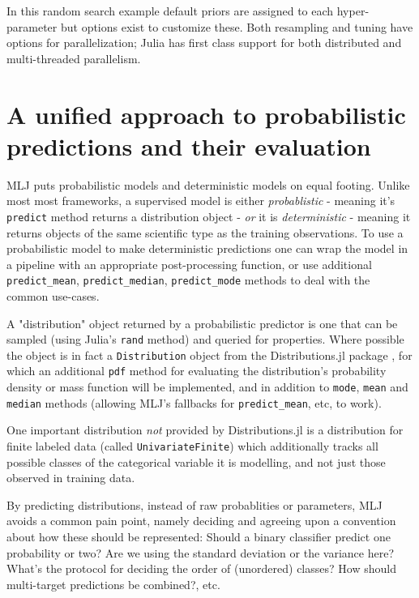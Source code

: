 \documentclass{article}
\begin{document}
In this random search example default priors are assigned to each hyper-parameter but options exist to customize these. Both resampling and tuning have options for parallelization; Julia has first class support for both distributed and multi-threaded parallelism.

\section{A unified approach to probabilistic predictions and their evaluation}

MLJ puts probabilistic models and deterministic models on equal footing. Unlike most most frameworks, a supervised model is either \textit{probablistic} - meaning it's \texttt{predict} method returns a distribution object - \textit{or} it is \textit{deterministic} - meaning it returns objects of the same scientific type as the training observations. To use a probabilistic model to make deterministic predictions one can wrap the model in a pipeline with an appropriate post-processing function, or use additional \texttt{predict\_mean}, \texttt{predict\_median}, \texttt{predict\_mode} methods to deal with the common use-cases.

A "distribution" object returned by a probabilistic predictor is one that can be sampled (using Julia's \texttt{rand} method) and queried for properties. Where possible the object is in fact a \texttt{Distribution} object from the Distributions.jl package \cite{LinEtal2020}, for which an additional \texttt{pdf} method for evaluating the distribution's probability density or mass function will be implemented, and in addition to \texttt{mode}, \texttt{mean} and \texttt{median} methods (allowing MLJ's fallbacks for \texttt{predict\_mean}, etc, to work).

One important distribution \textit{not} provided by Distributions.jl is a distribution for finite labeled data (called \texttt{UnivariateFinite}) which additionally tracks all possible classes of the categorical variable it is modelling, and not just those observed in training data.

By predicting distributions, instead of raw probablities or parameters, MLJ avoids a common pain point, namely deciding and agreeing upon a convention about how these should be represented: Should a binary classifier predict one probability or two? Are we using the standard deviation or the variance here? What's the protocol for deciding the order of (unordered) classes? How should multi-target predictions be combined?, etc.
\end{document}
